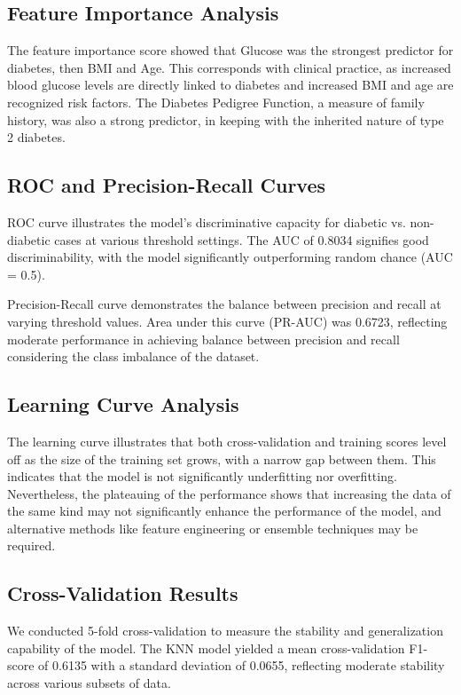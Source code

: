\documentclass[conference]{IEEEtran}
\begin{document}
\begin{itemize}
\subsection{Feature Importance Analysis}

The feature importance score showed that Glucose was the strongest predictor for diabetes, then BMI and Age. This corresponds with clinical practice, as increased blood glucose levels are directly linked to diabetes and increased BMI and age are recognized risk factors. The Diabetes Pedigree Function, a measure of family history, was also a strong predictor, in keeping with the inherited nature of type 2 diabetes.

\subsection{ROC and Precision-Recall Curves}

ROC curve illustrates the model's discriminative capacity for diabetic vs. non-diabetic cases at various threshold settings. The AUC of 0.8034 signifies good discriminability, with the model significantly outperforming random chance (AUC = 0.5).


Precision-Recall curve demonstrates the balance between precision and recall at varying threshold values. Area under this curve (PR-AUC) was 0.6723, reflecting moderate performance in achieving balance between precision and recall considering the class imbalance of the dataset.

\subsection{Learning Curve Analysis}
The learning curve illustrates that both cross-validation and training scores level off as the size of the training set grows, with a narrow gap between them. This indicates that the model is not significantly underfitting nor overfitting. Nevertheless, the plateauing of the performance shows that increasing the data of the same kind may not significantly enhance the performance of the model, and alternative methods like feature engineering or ensemble techniques may be required.


\subsection{Cross-Validation Results}
We conducted 5-fold cross-validation to measure the stability and generalization capability of the model. The KNN model yielded a mean cross-validation F1-score of 0.6135 with a standard deviation of 0.0655, reflecting moderate stability across various subsets of data.


\end{itemize}
\end{document}
